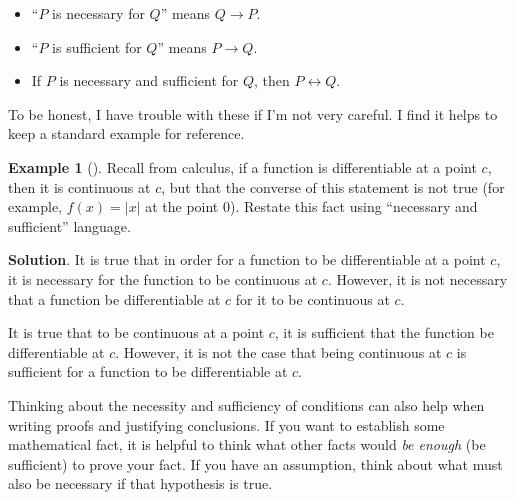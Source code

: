 \documentclass[10pt,]{book}
\theoremstyle{plain}
\theoremstyle{definition}
\theoremstyle{definition}
\newtheorem{example}[theorem]{Example}
\theoremstyle{definition}
\theoremstyle{definition}
\numberwithin{equation}{chapter}
\def\iff{\leftrightarrow}
\def\imp{\rightarrow}
\begin{document}
\begin{assemblage}\label{assemblage-21}
\hypertarget{p-1340}{}%
\par
\hypertarget{p-1341}{}%
%
\begin{itemize}[label=\textbullet]
\item{}``\(P\) is necessary for \(Q\)'' means \(Q \imp P\).%
\item{}``\(P\) is sufficient for \(Q\)'' means \(P \imp Q\).%
\item{}\hypertarget{p-1342}{}%
If \(P\) is necessary and sufficient for \(Q\), then \(P \iff Q\).%
\end{itemize}
%
\end{assemblage}
\hypertarget{p-1343}{}%
To be honest, I have trouble with these if I'm not very careful. I find it helps to keep a standard example for reference.%
\begin{example}[]\label{example-38}
\hypertarget{p-1344}{}%
Recall from calculus, if a function is differentiable at a point \(c\), then it is continuous at \(c\), but that the converse of this statement is not true (for example, \(f(x) = |x|\) at the point 0). Restate this fact using ``necessary and sufficient'' language.%
\par\smallskip%
\noindent\textbf{Solution}.\hypertarget{solution-122}{}\quad%
\hypertarget{p-1345}{}%
It is true that in order for a function to be differentiable at a point \(c\), it is necessary for the function to be continuous at \(c\). However, it is not necessary that a function be differentiable at \(c\) for it to be continuous at \(c\).%
\par
\hypertarget{p-1346}{}%
It is true that to be continuous at a point \(c\), it is sufficient that the function be differentiable at \(c\). However, it is not the case that being continuous at \(c\) is sufficient for a function to be differentiable at \(c\).%
\end{example}
\hypertarget{p-1347}{}%
Thinking about the necessity and sufficiency of conditions can also help when writing proofs and justifying conclusions. If you want to establish some mathematical fact, it is helpful to think what other facts would \emph{be enough} (be sufficient) to prove your fact. If you have an assumption, think about what must also be necessary if that hypothesis is true.%
\typeout{************************************************}
\typeout{************************************************}
\end{document}
